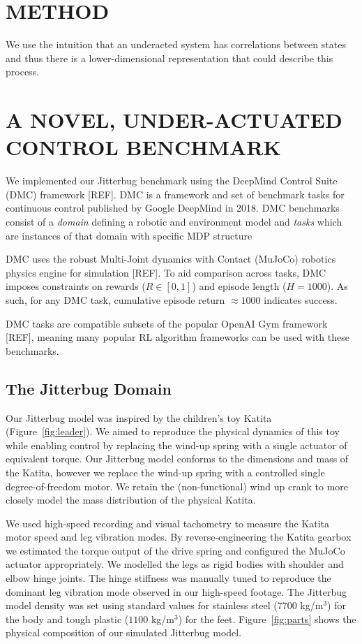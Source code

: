 \documentclass[letterpaper, 10 pt, conference]{ieeeconf}
\begin{document}
\section{METHOD}

We use the intuition that an underacted system has correlations between states %
and thus there is a lower-dimensional representation that could describe this process.  

\lipsum[1-4]

\section{A NOVEL, UNDER-ACTUATED CONTROL BENCHMARK}

We implemented our Jitterbug benchmark using the DeepMind Control Suite (DMC) framework [REF].
DMC is a framework and set of benchmark tasks for continuous control published by Google DeepMind in 2018.
DMC benchmarks consist of a \emph{domain} defining a robotic and environment model and \emph{tasks} which are instances of that domain with specific MDP structure

DMC uses the robust Multi-Joint dynamics with Contact (MuJoCo) robotics physics engine for simulation [REF].
To aid comparison across tasks, DMC imposes constraints on rewards ($R \in [0, 1]$) and episode length ($H = 1000$).
As such, for any DMC task, cumulative episode return $\approx 1000$ indicates success.

DMC tasks are compatible subsets of the popular OpenAI Gym framework [REF], meaning many popular RL algorithm frameworks can be used with these benchmarks.

\subsection{The Jitterbug Domain}

Our Jitterbug model was inspired by the children's toy Katita (Figure~\ref{fig:leader}).
We aimed to reproduce the physical dynamics of this toy while enabling control by replacing the wind-up spring with a single actuator of equivalent torque.
Our Jitterbug model conforms to the dimensions and mass of the Katita, however we replace the wind-up spring with a controlled single degree-of-freedom motor.
We retain the (non-functional) wind up crank to more closely model the mass distribution of the physical Katita.

We used high-speed recording and visual tachometry to measure the Katita motor speed and leg vibration modes.
By reverse-engineering the Katita gearbox we estimated the torque output of the drive spring and configured the MuJoCo actuator appropriately.
We modelled the legs as rigid bodies with shoulder and elbow hinge joints.
The hinge stiffness was manually tuned to reproduce the dominant leg vibration mode observed in our high-speed footage.
The Jitterbug model density was set using standard values for stainless steel ($7700$ kg/m$^3$) for the body and tough plastic ($1100$ kg/m$^3$) for the feet.
Figure~\ref{fig:parts} shows the physical composition of our simulated Jitterbug model.
\end{document}
